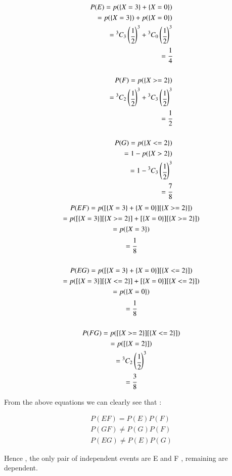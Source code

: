 \begin{enumerate}[label=\thesection.\arabic*.,ref=\thesection.\theenumi]
\begin{align}
    P(E)=p(\{X=3\}+\{X=0\})
\\
    =p(\{X=3\})+p(\{X=0\})
\\
    ={}^{3}C_{3}\begin{pmatrix}\cfrac{1}{2}\end{pmatrix}^3+{}^{3}C_{0}\begin{pmatrix}\cfrac{1}{2}\end{pmatrix}^3
\\
    =\cfrac{1}{4}
\\ \\
    P(F)=p(\{X>=2\})
\\
    ={}^{3}C_{2}\begin{pmatrix}\cfrac{1}{2}\end{pmatrix}^3+{}^{3}C_{3}\begin{pmatrix}\cfrac{1}{2}\end{pmatrix}^3
\\
    =\cfrac{1}{2}
\\ \\
    P(G)=p(\{X<=2\})
\\
    =1-p(\{X>2\})
\\
    =1-{}^{3}C_{3}\begin{pmatrix}\cfrac{1}{2}\end{pmatrix}^3
\\
    =\cfrac{7}{8}
\end{align}
\begin{multline}
    P(EF)=p([\{X=3\}+\{X=0\}][\{X>=2\}])
\\
    =p([\{X=3\}][\{X>=2\}]+[\{X=0\}][\{X>=2\}])
\\
    =p(\{X=3\})
\\
    =\cfrac{1}{8}
\\  \\
    P(EG)=p([\{X=3\}+\{X=0\}][\{X<=2\}])
\\
    =p([\{X=3\}][\{X<=2\}]+[\{X=0\}][\{X<=2\}])
\\
    =p(\{X=0\})
\\
    =\cfrac{1}{8}
\\  \\
    P(FG)=p([\{X>=2\}][\{X<=2\}])
\\
    =p([\{X=2\}])
\\
    ={}^{3}C_{2}\begin{pmatrix}\cfrac{1}{2}\end{pmatrix}^3
\\
    =\cfrac{3}{8}    
\end{multline}

From the above equations we can clearly see that :

\begin{align}
    P(EF)= P(E)P(F)
\\
    P(GF)\neq P(G)P(F)
\\
    P(EG)\neq P(E)P(G)
\end{align}

Hence , the only pair of independent events are E and F , remaining are dependent.



\end{enumerate}



